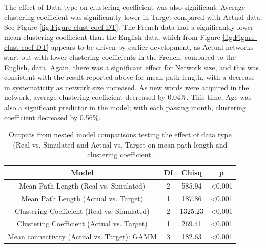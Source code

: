 \documentclass[
  man]{apa6}
\begin{document}
The effect of Data type on clustering coefficient was also significant. Average clustering coefficient was significantly lower in Target compared with Actual data. See Figure \ref{fig:Figure-clust-coef-DT}. The French data had a significantly lower mean clustering coefficient than the English data, which from Figure \ref{fig:Figure-clust-coef-DT} appears to be driven by earlier development, as Actual networks start out with lower clustering coefficients in the French, compared to the English, data. Again, there was a significant effect for Network size, and this was consistent with the result reported above for mean path length, with a decrease in systematicity as network size increased. As new words were acquired in the network, average clustering coefficient decreased by 0.04\%. This time, Age was also a significant predictor in the model; with each passing month, clustering coefficient decreased by 0.56\%.

\begin{longtable}[t]{cccc}
\caption{\label{tab:table-model-output}Outputs from nested model comparisons testing the effect of data type (Real vs. Simulated and Actual vs. Target on mean path length and clustering coefficient.}\\
\toprule
Model & Df & Chisq & p\\
\midrule
Mean Path Length (Real vs. Simulated) & 2 & 585.94 & <0.001\\
Mean Path Length (Actual vs. Target) & 1 & 187.86 & <0.001\\
Clustering Coefficient (Real vs. Simulated) & 2 & 1325.23 & <0.001\\
Clustering Coefficient (Actual vs. Target) & 1 & 269.41 & <0.001\\
Mean connectivity (Actual vs. Target): GAMM & 3 & 182.63 & <0.001\\
\bottomrule
\end{longtable}
\end{document}
